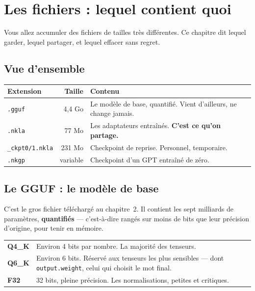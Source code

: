 \chapter{Les fichiers : lequel contient quoi}

Vous allez accumuler des fichiers de tailles très différentes. Ce chapitre dit
lequel garder, lequel partager, et lequel effacer sans regret.

\section{Vue d'ensemble}

\begin{center}
\begin{longtable}{p{2.5cm}rp{9.0cm}}
\toprule
\textbf{Extension} & \textbf{Taille} & \textbf{Contenu} \\
\midrule
\endhead
\texttt{.gguf} & 4,4 Go & Le modèle de base, quantifié. Vient d'ailleurs, ne
   change jamais. \\
\texttt{.nkla} & 77 Mo & Les adaptateurs entraînés. \textbf{C'est ce qu'on
   partage.} \\
\texttt{\_ckpt0/1.nkla} & 231 Mo & Checkpoint de reprise. Personnel, temporaire. \\
\texttt{.nkgp} & variable & Checkpoint d'un GPT entraîné de zéro. \\
\bottomrule
\end{longtable}
\end{center}

\section{Le GGUF : le modèle de base}

C'est le gros fichier téléchargé au chapitre~2. Il contient les sept milliards de
paramètres, \textbf{quantifiés} — c'est-à-dire rangés sur moins de bits que leur
précision d'origine, pour tenir en mémoire.

\begin{center}
\begin{tabular}{lp{9.8cm}}
\toprule
\textbf{Q4\_K} & Environ 4 bits par nombre. La majorité des tenseurs. \\
\textbf{Q6\_K} & Environ 6 bits. Réservé aux tenseurs les plus sensibles — dont
   \texttt{output.weight}, celui qui choisit le mot final. \\
\textbf{F32} & 32 bits, pleine précision. Les normalisations, petites et
   critiques. \\
\bottomrule
\end{tabular}
\end{center}

